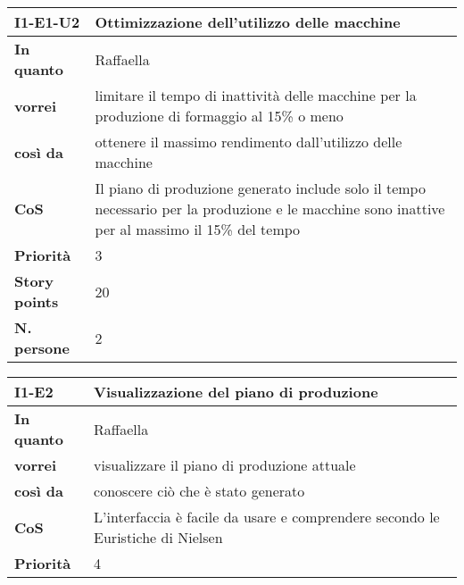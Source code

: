 \begin{table}[H]
  \begin{tabularx}{\textwidth}{lX}
    \toprule
    \textbf{I1-E1-U2} & \textbf{Ottimizzazione dell'utilizzo delle macchine} \\
    \midrule
    \textbf{In quanto} & Raffaella \\
    \textbf{vorrei} & limitare il tempo di inattività delle macchine per la produzione di formaggio al 15\% o meno \\
    \textbf{così da} & ottenere il massimo rendimento dall'utilizzo delle macchine \\
    \midrule
    \textbf{CoS} & Il piano di produzione generato include solo il tempo necessario per la produzione e le macchine sono inattive per al massimo il 15\% del tempo \\
    \midrule
    \textbf{Priorità} & 3 \\
    \textbf{Story points} & 20 \\
    \textbf{N. persone} & 2 \\
    \bottomrule
  \end{tabularx}
  \label{user-story:i1-e1-u2}
\end{table}

\begin{table}[H]
  \begin{tabularx}{\textwidth}{lX}
    \toprule
    \textbf{I1-E2} & \textbf{Visualizzazione del piano di produzione} \\
    \midrule
    \textbf{In quanto} & Raffaella \\
    \textbf{vorrei} & visualizzare il piano di produzione attuale \\
    \textbf{così da} & conoscere ciò che è stato generato \\
    \midrule
    \textbf{CoS} & L'interfaccia è facile da usare e comprendere secondo le Euristiche di Nielsen~\cite{cit:nielsen} \\
    \midrule
    \textbf{Priorità} & 4 \\
    \bottomrule
  \end{tabularx}
  \label{user-story:i1-e2}
\end{table}


